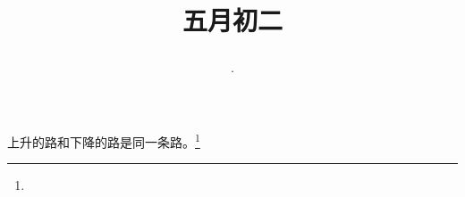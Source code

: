 \title{\date[d=7,m=6,y=2024][year:cn-y,年,month:cn,day:cn,日,·,weekday]·五月初二 }
上升的路和下降的路是同一条路。\footnote{ }

